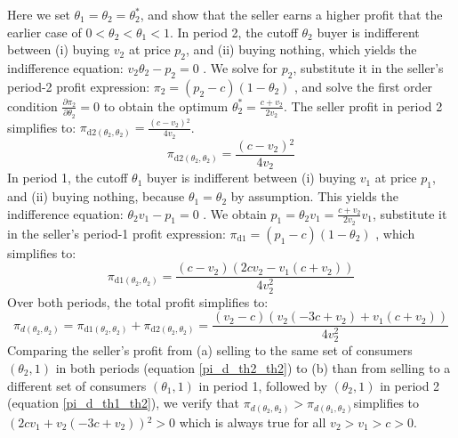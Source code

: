 \documentclass[isre,blindrev]{informs3} %
\begin{document}
Here we set \(\theta _1=\theta _2=\theta _2^*\), and show that the seller earns a higher profit that the earlier case of \(0<\theta _2<\theta _1<1\).
In period 2, the cutoff \(\theta _2\) buyer is indifferent between (i) buying \(v_2\) at price \(p_2\), and (ii) buying nothing, which yields the
indifference equation: \(v_2 \theta _2-p_2 = 0\) . We solve for \(p_2\), substitute it in the seller{'}s period-2 profit expression: \(\pi _2=\left(p_2-c\right)\left(1-\theta
_2\right)\) , and solve the first order condition \(\frac{\partial \pi _2}{\partial \theta _2}=0\) to obtain the optimum \(\theta _2^*=\frac{c+v_2}{2
v_2}\). The seller profit in period 2 simplifies to: \(\pi _{\text{d2}\left(\theta _2,\theta _2\right)}=\frac{\left(c-v_2\right){}^2}{4 v_2}\).
\begin{equation}\label{pi_d2_th2_th2}
\pi _{\text{d2}\left(\theta _2,\theta _2\right)}=\frac{\left(c-v_2\right){}^2}{4 v_2}
\end{equation}
In period 1, the cutoff \(\theta _1\) buyer is indifferent between (i) buying \(v_1\) at price \(p_1\), and (ii) buying nothing, because \(\theta
_1=\theta _2\) by assumption. This { }yields the indifference equation: \(\theta _2v_1 - p_1 = 0\) . We obtain \(p_1=\theta _2v_1=\frac{c+v_2}{2
v_2}v_1\), substitute it in the seller{'}s period-1 profit expression: \(\pi _{\text{d1}}=\left(p_1-c\right)\left(1-\theta _2\right)\) , which simplifies
to:
\begin{equation}
\pi _{\text{d1}\left(\theta _2,\theta _2\right)}=\frac{\left(c-v_2\right) \left(2 c v_2-v_1 \left(c+v_2\right)\right)}{4 v_2^2}
\end{equation}
Over both periods, the total profit simplifies to:
\begin{equation}\label{pi_d_th2_th2}
\pi _{d\left(\theta _2,\theta _2\right)}=\pi _{\text{d1}\left(\theta _2,\theta _2\right)}+\pi _{\text{d2}\left(\theta _2,\theta _2\right)}=\frac{\left(v_2-c\right)
\left(v_2 \left(-3 c+v_2\right)+v_1 \left(c+v_2\right)\right)}{4 v_2^2}
\end{equation}
Comparing the seller{'}s profit from (a) selling to the same set of consumers \(\left(\theta _2,1\right)\) in both periods (equation \ref{pi_d_th2_th2}) to (b) than
from selling to a different set of consumers \(\left(\theta _1,1\right)\) in period 1, followed by \(\left(\theta _2,1\right)\) in period 2 (equation
\ref{pi_d_th1_th2}), we verify that \(\pi _{d\left(\theta _2,\theta _2\right)}>\pi _{d\left(\theta _1,\theta _2\right)}\)simplifies to \(\left(2 c v_1+v_2 \left(-3
c+v_2\right)\right){}^2>0\) which is always true for all \(v_2>v_1>c>0\).
\qedsymbol
\end{document}
